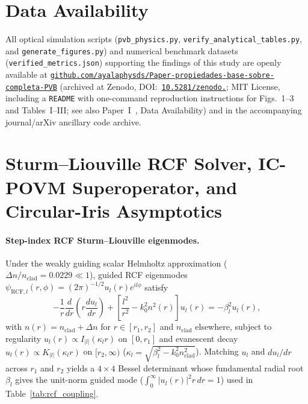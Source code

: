 \documentclass[aps,pra,onecolumn,notitlepage,11pt,tightenlines,nofootinbib,floatfix,longbibliography]{revtex4-2}
\newcommand{\abs}[1]{\lvert #1 \rvert}
\begin{document}
\section*{Data Availability}
{\sloppy All optical simulation scripts (\texttt{pvb\_\allowbreak physics.py}, \texttt{verify\_\allowbreak analytical\_\allowbreak tables.py}, and \texttt{generate\_\allowbreak figures.py}) and numerical benchmark datasets (\texttt{verified\_\allowbreak metrics.json}) supporting the findings of this study are openly available at \href{https://github.com/ayalaphysds/Paper-propiedades-base-sobre-completa-PVB}{\texttt{github.com/\allowbreak ayalaphysds/\allowbreak Paper-\allowbreak propiedades-\allowbreak base-\allowbreak sobre-\allowbreak completa-\allowbreak PVB}} (archived at Zenodo, DOI:~\href{https://doi.org/10.5281/zenodo.24426770}{\texttt{10.5281/\allowbreak zenodo.}}; MIT License, including a \texttt{README} with one-command reproduction instructions for Figs.~1--3 and Tables~I--III; see also Paper~I~\cite{AyalaPaperI}, Data Availability) and in the accompanying journal/arXiv ancillary code archive.\par}

\appendix

\section{Sturm--Liouville RCF Solver, IC-POVM Superoperator, and Circular-Iris Asymptotics}
\label{app:methods}

\paragraph*{Step-index RCF Sturm--Liouville eigenmodes.}
Under the weakly guiding scalar Helmholtz approximation ($\Delta n / n_{\mathrm{clad}} = 0.0229 \ll 1$), guided RCF eigenmodes $\psi_{\mathrm{RCF},l}(r,\phi) = (2\pi)^{-1/2} u_l(r) e^{il\phi}$ satisfy
\begin{equation}
-\frac{1}{r}\frac{d}{dr}\!\left(r\frac{du_l}{dr}\right) + \left[\frac{l^2}{r^2} - k_0^2 n^2(r)\right] u_l(r) = -\beta_l^2 u_l(r),
\label{eq:app_sl_ode}
\end{equation}
with $n(r) = n_{\mathrm{clad}} + \Delta n$ for $r \in [r_1, r_2]$ and $n_{\mathrm{clad}}$ elsewhere, subject to regularity $u_l(r) \propto I_{\abs{l}}(\kappa_l r)$ on $[0,r_1]$ and evanescent decay $u_l(r) \propto K_{\abs{l}}(\kappa_l r)$ on $[r_2,\infty)$ ($\kappa_l = \sqrt{\beta_l^2 - k_0^2 n_{\mathrm{clad}}^2}$). Matching $u_l$ and $du_l/dr$ across $r_1$ and $r_2$ yields a $4\times 4$ Bessel determinant whose fundamental radial root $\beta_l$ gives the unit-norm guided mode ($\int_0^\infty \abs{u_l(r)}^2 r\,dr = 1$) used in Table~\ref{tab:rcf_coupling}.
\end{document}
